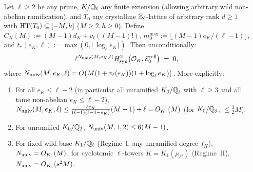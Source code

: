 \begin{theorem}\label{thm:2:h2syn}
\tagProved{}
Let $\ell \ge 2$ be any prime, $K/\mathbb{Q}_\ell$ any finite extension (allowing arbitrary wild non-abelian ramification), and $T_0$ any crystalline $\mathbb{Z}_\ell$-lattice of arbitrary rank $d \ge 1$ with $\mathrm{HT}(T_0) \subseteq [-M, h]$ ($M \ge 2, h \ge 0$). Define $C_K(M) := (M-1)d_K + v_\ell((M-1)!)$, $m_0^{\max} := \lfloor (M-1)e_K/(\ell-1)\rfloor$, and $t_*(e_K, \ell) := \max(0, \lceil \log_\ell e_K \rceil)$. Then unconditionally:
\begin{equation}\label{eq:2:nuniv}
  \ell^{N_{\mathrm{univ}}(M, e_K, \ell)} H^2_{\mathrm{syn}}\bigl(\mathcal{O}_K, \mathcal{E}_0^{\mathrm{refl}}\bigr) \;=\; 0,
\end{equation}
where $N_{\mathrm{univ}}(M, e_K, \ell) = O\bigl(M(1 + v_\ell(e_K))(1 + \log_\ell e_K)\bigr)$. More explicitly:
\begin{enumerate}[label=\textup{(\roman*)}]
\item For all $e_K \le \ell - 2$ (in particular all unramified $K_0/\mathbb{Q}_\ell$ with $\ell \ge 3$ and all tame non-abelian $e_K \le \ell - 2$), $N_{\mathrm{univ}}(M, e_K, \ell) \le \frac{\ell e_K}{(\ell-1)(\ell-1-e_K)}(M-1) + \ell = O_{K_1}(M)$ (for $K_0/\mathbb{Q}_3$, $\le \frac{3}{2}M$).
\item For unramified $K_0/\mathbb{Q}_2$, $N_{\mathrm{univ}}(M, 1, 2) \le 6(M-1)$.
\item For fixed wild base $K_1/\mathbb{Q}_\ell$ (Regime~I, any unramified degree $f_K$), $N_{\mathrm{univ}} = O_{K_1}(M)$; for cyclotomic $\ell$-towers $K = K_1(\mu_{\ell^s})$ (Regime~II), $N_{\mathrm{univ}} = O_{K_1}(s^2 M)$.
\end{enumerate}
\end{theorem}
